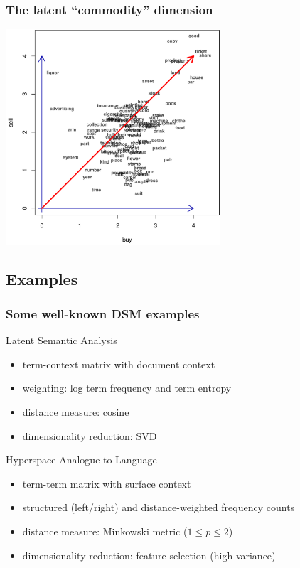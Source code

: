 \documentclass[t]{beamer} %
\begin{document}
\begin{frame}[c]
  \frametitle{The latent ``commodity'' dimension}
  \begin{center}
    \ungap[1]
    \includegraphics[width=8cm]{img/3_buy_sell_labels_latent}
  \end{center}
\end{frame}


\subsection{Examples}

\begin{frame}
  \frametitle{Some well-known DSM examples}

  \ungap
  \begin{block} {Latent Semantic Analysis \citep{Landauer:Dumais:97}}
  \begin{itemize}
  \item term-context matrix with document context
  \item weighting: log term frequency and term entropy
  \item distance measure: cosine
  \item dimensionality reduction: SVD
  \end{itemize}
  \end{block}
 
 \begin{block} {Hyperspace Analogue to Language \citep{Lund:Burgess:96}}
  \begin{itemize}
  \item term-term matrix with surface context
  \item structured (left/right) and distance-weighted frequency counts
  \item distance measure: Minkowski metric ($1\leq p \leq 2$)
  \item dimensionality reduction: feature selection (high variance)
  \end{itemize}
  \end{block}
\end{frame}
\end{document}
